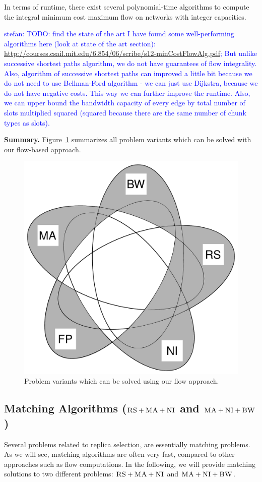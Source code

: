 \documentclass[9pt]{sigcomm-alternate}
\newcommand{\stefan}[1]{\textcolor{blue}{stefan: #1}}
\newcommand{\CC}{\textsc{NI}}
\newcommand{\RS}{\textsc{RS}}
\newcommand{\BW}{\textsc{BW}}
\newcommand{\MA}{\textsc{MA}}
\begin{document}
In terms of runtime, there exist several polynomial-time algorithms to compute
the integral minimum cost maximum flow on networks with integer capacities.

\stefan{TODO: find the state of the art
I have found some well-performing algorithms here (look at state of the art section):
  \url{http://courses.csail.mit.edu/6.854/06/scribe/s12-minCostFlowAlg.pdf}; But unlike successive shortest paths algorithm, we do not have guarantees of flow integrality.
Also, algorithm of successive shortest paths can improved a little bit because we do not need to use Bellman-Ford algorithm - we can just use Dijkstra, because we do not have negative costs. This way we can further improve the runtime.
Also, we can upper bound the bandwidth capacity of every edge by total number of slots multiplied squared (squared because there are the same number of chunk types as slots).
}

\textbf{Summary.}
Figure~\ref{fig:venn_flow} summarizes all problem
variants which can be solved with our flow-based approach.
\begin{figure}
\includegraphics[width=0.48\columnwidth]{figs/venn_flow.pdf}
\caption{Problem variants which can be solved using our flow approach.}
\label{fig:venn_flow}
\end{figure}


\subsection{Matching Algorithms ($\RS+\MA+\CC$ and $\MA+\CC+\BW$)}\label{ssec:match}

Several problems related to replica selection,
are essentially matching problems. As we will see,
matching algorithms are often very fast, compared
to other approaches such as flow computations.
In the following, we will provide matching solutions to
two different problems: $\RS+\MA+\CC$ and $\MA+\CC+\BW$.
\end{document}
